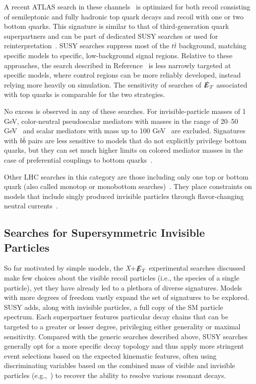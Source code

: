 \documentclass{ar-1col}
\newcommand{\IP}{invisible particle}
\newcommand{\MET}{\ensuremath{\slashed{E}_T}\xspace}
\begin{document}
A recent ATLAS search in these channels~\cite{Aaboud:2017rzf} is
optimized for both recoil consisting of semileptonic and fully
hadronic top quark decays and recoil with one or two bottom
quarks. This signature is similar to that of third-generation
quark superpartners and can be part of dedicated SUSY searches or
used for reinterpretation~\cite{Aaboud:2017aeu,Sirunyan:2017leh}.
SUSY searches suppress most of the $t\bar{t}$ background, matching
specific models to specific, low-background signal regions.
Relative to these approaches, the search described in
Reference~ is less narrowly targeted at specific
models, where control regions can be more reliably developed,
instead relying more heavily on simulation. The sensitivity of
searches of \MET associated with top quarks is comparable for the
two strategies.

No excess is observed in any of these searches. For invisible-particle masses of
1 GeV, color-neutral pseudoscalar mediators with masses in the range of 20--50
GeV~\cite{Aaboud:2017aeu} and scalar mediators with mass up to 100
GeV~\cite{Sirunyan:2017leh} are excluded. Signatures with
$b\bar{b}$ pairs are less sensitive to models that do not
explicitly privilege bottom quarks, but they can set much higher limits
on colored mediator masses in the case of preferential couplings to
bottom quarks~\cite{Agrawal:2014una}.

Other LHC searches in this category are those including only
one top or bottom quark (also called monotop or monobottom
searches)~\cite{Sirunyan:2018gka, Aad:2014wza}. They place
constraints on models that include singly produced {\IP}s through
flavor-changing neutral currents~\cite{Boucheneb:2014wza}.

\subsection{Searches for Supersymmetric Invisible Particles}\label{sec:results_SUSYSearches}

So far motivated by simple models, the \textit{X}+\MET experimental
searches discussed make few choices about the visible recoil
particles (i.e., the species of a single particle), yet they have
already led to a plethora of diverse signatures. Models with more degrees of freedom vastly expand the set of
signatures to be explored. SUSY adds, along with
{\IP}s, a full copy of the SM particle
spectrum. Each superpartner features particular decay chains that
can be targeted to a greater or lesser degree, privileging either
generality or maximal sensitivity. Compared with the generic
searches described above, SUSY searches generally opt for a more specific
decay topology and thus apply more stringent event selections
based on the expected kinematic features, often using
discriminating variables based on the combined mass of visible and
invisible particles (e.g.,~) to recover
the ability to resolve various resonant decays.
\end{document}
